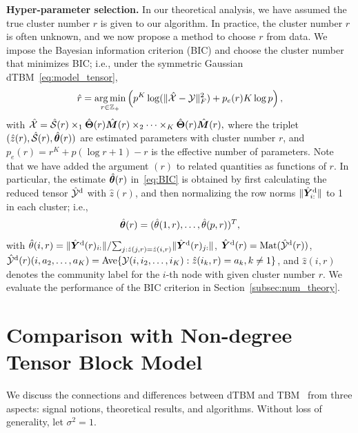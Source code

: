 \documentclass[journal]{IEEEtran}
\theoremstyle{definition}
\theoremstyle{definition}
\newcommand{\of}[1]{\left(#1\right)}
\begin{document}
{\bf Hyper-parameter selection.} In our theoretical analysis, we have assumed the true cluster number $r$ is given to our algorithm. In practice, the cluster number $r$ is often unknown, and we now propose a method to choose $r$ from data. We impose the Bayesian information criterion (BIC) and choose the cluster number that minimizes BIC; i.e., under the symmetric Gaussian dTBM~\eqref{eq:model_tensor},
\begin{align}\label{eq:BIC}
 \hat r = \argmin_{r \in \mathbb{Z}_+ } \of{p^K \log(\onormSize{}{\hat \tX - \tY}_F^2)  + p_e(r) K \log p},
\end{align}
with $\hat {\mathcal{X}} = \hat {\mathcal{S}}(r) \times_1 \hat {\boldsymbol{\Theta}}(r) \hat {\bm M}(r) \times_2 \cdots \times_K \hat {\boldsymbol{\Theta}}(r) \hat {\bm M}(r),$ where the triplet $(\hat z(r), \hat {\mathcal{S}}(r),\hat {\boldsymbol{\theta}}(r))$ are estimated parameters with cluster number $r$, and $p_e (r)= r^K + p(\log r + 1) - r$ is the effective number of parameters. Note that we have added the argument $(r)$ to related quantities as functions of $r$. In particular, the estimate $\hat {\boldsymbol{\theta}}(r)$ in~\eqref{eq:BIC} is obtained by first calculating the reduced tensor $\hat {\mathcal{Y}}^{\text{d}}$ with $\hat z(r)$, and then normalizing the row norms $\lVert\hat {\bm Y}_{i:}^{\text{d}}\rVert$ to 1 in each cluster; i.e., 
\begin{equation}
 \hat {\boldsymbol{\theta}}(r)=(\hat \theta(1,r),\ldots,\hat \theta(p,r))^T,
\end{equation}
with $\hat \theta(i,r) = {\lVert\hat {\bm Y}^{\text{d}}(r)_{i:}\rVert}/{\sum_{j: \hat z(j,r) =  \hat z(i,r)} \lVert\hat {\bm Y}^{\text{d}}(r)_{j:}\rVert}$, $\hat {\bm Y}^{\text{d}}(r) = \text{Mat}(\hat {\mathcal{Y}}^{\text{d}}(r))$, $\hat {\mathcal{Y}}^{\text{d}}(r)(i,a_2,\ldots,a_K) =  \text{Ave}\{\mathcal{Y}(i,i_2,\ldots,i_K): \hat z(i_k, r) = a_k, k \neq 1 \}$, and $\hat z(i,r)$ denotes the community label for the $i$-th node with given cluster number $r$. We evaluate the performance of the BIC criterion in Section~\ref{subsec:num_theory}.

\section{Comparison with Non-degree Tensor Block Model} \label{sec:tbm}

We discuss the connections and differences between dTBM and TBM~\citep{han2020exact} from three aspects: signal notions, theoretical results, and algorithms. Without loss of generality, let $\sigma^2=1$. 
\end{document}
